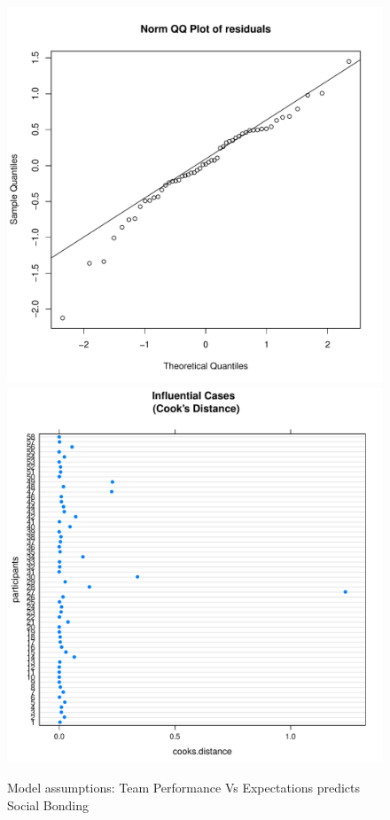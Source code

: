 \begin{CJK}{UTF8}{gbsn}
\begin{figure}[htbp]
    \includegraphics[scale =.4]{images/TEM3QQNorm.pdf}
    \includegraphics[scale =.4]{images/TEM3CooksD.pdf}
    \caption{Model assumptions: Team Performance Vs Expectations predicts Social Bonding}
    \label{fig:M3Assumptions}
\end{figure}



\end{CJK}
